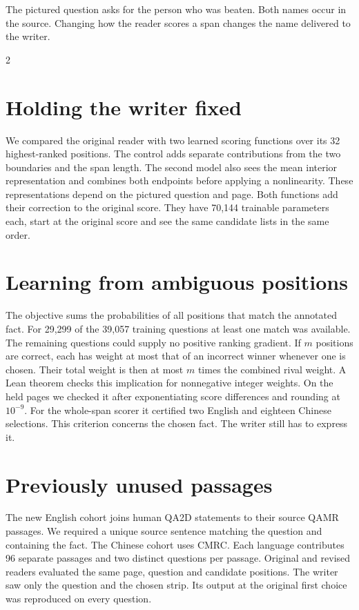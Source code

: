 \noindent The pictured question asks for the person who was beaten. Both names occur in the source. Changing how the reader scores a span changes the name delivered to the writer.
\begin{multicols}{2}
\section*{Holding the writer fixed}
We compared the original reader with two learned scoring functions over its 32 highest-ranked positions. The control adds separate contributions from the two boundaries and the span length. The second model also sees the mean interior representation and combines both endpoints before applying a nonlinearity. These representations depend on the pictured question and page. Both functions add their correction to the original score. They have 70,144 trainable parameters each, start at the original score and see the same candidate lists in the same order.
\section*{Learning from ambiguous positions}
The objective sums the probabilities of all positions that match the annotated fact. For 29,299 of the 39,057 training questions at least one match was available. The remaining questions could supply no positive ranking gradient. If $m$ positions are correct, each has weight at most that of an incorrect winner whenever one is chosen. Their total weight is then at most $m$ times the combined rival weight. A Lean theorem checks this implication for nonnegative integer weights. On the held pages we checked it after exponentiating score differences and rounding at $10^{-9}$. For the whole-span scorer it certified two English and eighteen Chinese selections. This criterion concerns the chosen fact. The writer still has to express it.
\section*{Previously unused passages}
The new English cohort joins human QA2D statements to their source QAMR passages. We required a unique source sentence matching the question and containing the fact. The Chinese cohort uses CMRC. Each language contributes 96 separate passages and two distinct questions per passage. Original and revised readers evaluated the same page, question and candidate positions. The writer saw only the question and the chosen strip. Its output at the original first choice was reproduced on every question.
\end{multicols}
